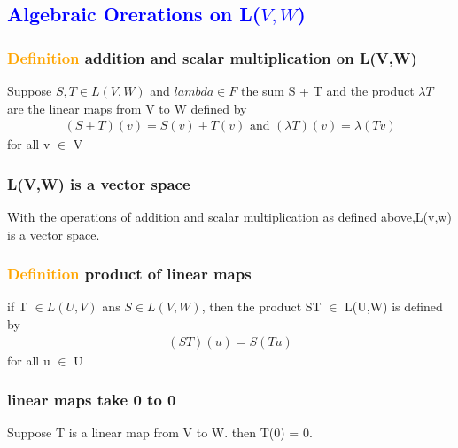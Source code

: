 \documentclass[a4paper,12pt]{article}
\begin{document}
    \subsection{\textcolor{blue}{Algebraic Orerations on L($V,W$)}}
    \subsubsection{\textcolor{orange}{Definition} \textbf{addition and scalar multiplication on L(V,W)}}
    Suppose $S, T \in L(V,W)$ and $lambda \in F$ the sum S + T and the product $\lambda{T}$ are the linear
    maps from V to W defined by
    \begin{align*}
        (S + T)(v) = S(v) + T(v) \text{ and } (\lambda{T})(v) = \lambda(Tv)
    \end{align*}
    for all v $\in$ V
    \subsubsection{L(V,W) is a vector space}
    With the operations of addition and scalar multiplication as defined above,L(v,w) is a vector space.
    \subsubsection{\textcolor{orange}{Definition} \textbf{product of linear maps}}
    if T $\in L(U, V)$ ans $S \in L(V,W)$, then the product ST $\in$ L(U,W) is defined by
    \begin{align*}
        (ST)(u) = S(Tu)
    \end{align*}
    for all u $\in$ U
    \subsubsection{linear maps take 0 to 0}
    Suppose T is a linear map from V to W. then T(0) = 0.
\end{document}
